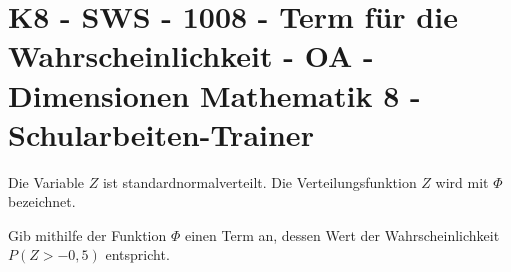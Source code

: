 \section{K8 - SWS - 1008 - Term für die Wahrscheinlichkeit - OA - Dimensionen Mathematik 8 - Schularbeiten-Trainer}

\begin{beispiel}[K8 - SWS]{1}
Die Variable $Z$ ist standardnormalverteilt. Die Verteilungsfunktion $Z$ wird mit $\Phi$ bezeichnet.

Gib mithilfe der Funktion $\Phi$ einen Term an, dessen Wert der Wahrscheinlichkeit $P(Z>-0,5)$ entspricht.

\end{beispiel}